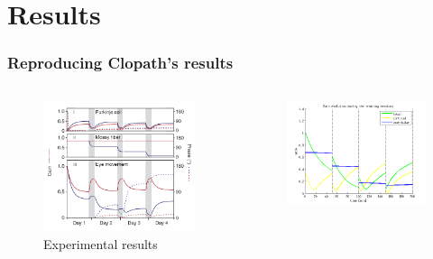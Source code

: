 \documentclass[10pt, compress]{beamer}
\begin{document}
\section{Results}

\begin{frame}[fragile]
  \frametitle{Reproducing Clopath's results}
  \begin{columns}[onlytextwidth]
      \begin{figure}
        \includegraphics[scale=0.25]{images/gain.png}
        \caption{Experimental results}
      \end{figure}
    \begin{figure}
      \includegraphics[scale=0.25]{images/longnoi_12.png}

\end{figure}
\end{columns}
\end{frame}
\end{document}
